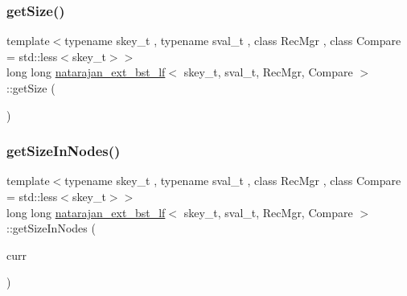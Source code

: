 \mbox{\label{classnatarajan__ext__bst__lf_ac8b9304e8bf0c244a0efb0467a385c23}} 
\subsubsection{\texorpdfstring{get\+Size()}{getSize()}\hspace{0.1cm}{\footnotesize\ttfamily [4/4]}}
{\footnotesize\ttfamily template$<$typename skey\+\_\+t , typename sval\+\_\+t , class Rec\+Mgr , class Compare  = std\+::less$<$skey\+\_\+t$>$$>$ \\
long long \hyperlink{classnatarajan__ext__bst__lf}{natarajan\+\_\+ext\+\_\+bst\+\_\+lf}$<$ skey\+\_\+t, sval\+\_\+t, Rec\+Mgr, Compare $>$\+::get\+Size (\begin{DoxyParamCaption}{ }\end{DoxyParamCaption})\hspace{0.3cm}{\ttfamily [inline]}}

\mbox{\label{classnatarajan__ext__bst__lf_a39d920a7b800482d29679e70b79fb04e}} 
\subsubsection{\texorpdfstring{get\+Size\+In\+Nodes()}{getSizeInNodes()}\hspace{0.1cm}{\footnotesize\ttfamily [1/4]}}
{\footnotesize\ttfamily template$<$typename skey\+\_\+t , typename sval\+\_\+t , class Rec\+Mgr , class Compare  = std\+::less$<$skey\+\_\+t$>$$>$ \\
long long \hyperlink{classnatarajan__ext__bst__lf}{natarajan\+\_\+ext\+\_\+bst\+\_\+lf}$<$ skey\+\_\+t, sval\+\_\+t, Rec\+Mgr, Compare $>$\+::get\+Size\+In\+Nodes (\begin{DoxyParamCaption}\item[{\hyperlink{structnode__t}{node\+\_\+t}$<$ skey\+\_\+t, sval\+\_\+t $>$ $\ast$const}]{curr }\end{DoxyParamCaption})\hspace{0.3cm}{\ttfamily [inline]}}

